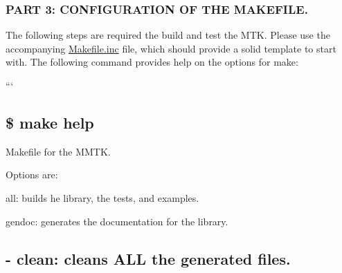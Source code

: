 \begin{DoxyPre}\subsubsection*{PART 3: CONFIGURATION OF THE MAKEFILE.}\end{DoxyPre}



\begin{DoxyPre}\end{DoxyPre}



\begin{DoxyPre}The following steps are required the build and test the MTK. Please use the
accompanying {\ttfamily \hyperlink{Makefile_8inc}{Makefile.inc}} file, which should provide a solid template to
start with. The following command provides help on the options for make:\end{DoxyPre}



\begin{DoxyPre}```
\subsection*{\$ make help
}\end{DoxyPre}



\begin{DoxyPre}
Makefile for the MMTK.\end{DoxyPre}



\begin{DoxyPre}Options are:
\begin{DoxyItemize}
\item all: builds he library, the tests, and examples.
\end{DoxyItemize}\end{DoxyPre}



\begin{DoxyPre}
\begin{DoxyItemize}
\item gendoc: generates the documentation for the library.
\end{DoxyItemize}\end{DoxyPre}



\begin{DoxyPre}\subsection*{- clean: cleans ALL the generated files.
}\end{DoxyPre}



